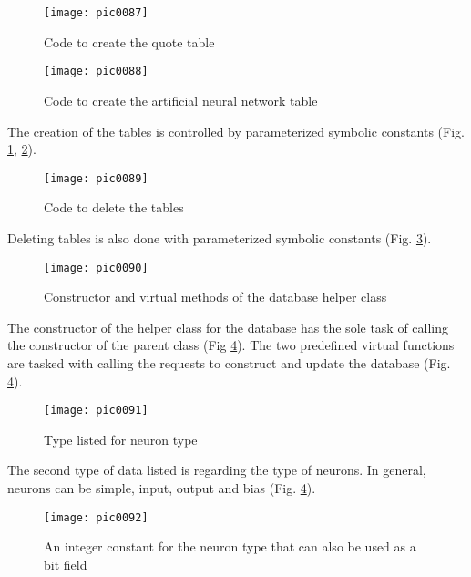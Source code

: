 \begin{figure}[h]
\centering
\texttt{[image: pic0087]}
\caption{Code to create the quote table}
\label{fig:pic0087}
\end{figure}
\FloatBarrier

\begin{figure}[h]
\centering
\texttt{[image: pic0088]}
\caption{Code to create the artificial neural network table}
\label{fig:pic0088}
\end{figure}
\FloatBarrier

The creation of the tables is controlled by parameterized symbolic constants (Fig. \ref{fig:pic0087}, \ref{fig:pic0088}).

\begin{figure}[h]
\centering
\texttt{[image: pic0089]}
\caption{Code to delete the tables}
\label{fig:pic0089}
\end{figure}
\FloatBarrier

Deleting tables is also done with parameterized symbolic constants (Fig. \ref{fig:pic0089}).

\begin{figure}[h]
\centering
\texttt{[image: pic0090]}
\caption{Constructor and virtual methods of the database helper class}
\label{fig:pic0090}
\end{figure}
\FloatBarrier

The constructor of the helper class for the database has the sole task of calling the constructor of the parent class (Fig \ref{fig:pic0090}). The two predefined virtual functions are tasked with calling the requests to construct and update the database (Fig. \ref{fig:pic0090}).

\begin{figure}[h]
\centering
\texttt{[image: pic0091]}
\caption{Type listed for neuron type}
\label{fig:pic0091}
\end{figure}
\FloatBarrier

The second type of data listed is regarding the type of neurons. In general, neurons can be simple, input, output and bias (Fig. \ref{fig:pic0090}).

\begin{figure}[h]
\centering
\texttt{[image: pic0092]}
\caption{An integer constant for the neuron type that can also be used as a bit field}
\label{fig:pic0092}
\end{figure}
\FloatBarrier

